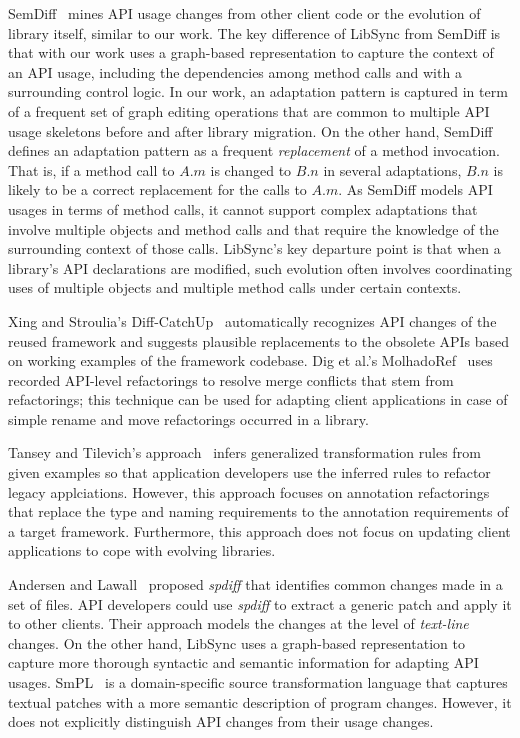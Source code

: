 \documentclass[runningheads,a4paper]{llncs}
\begin{document}
SemDiff~\cite{Dagenais2008} mines API usage changes from other client code or the evolution of library itself, similar to our work.  The key difference of {LibSync} from SemDiff is that with our work uses a graph-based representation to capture the context of an API usage, including the dependencies among method calls and with a surrounding control logic. In our work, an adaptation pattern is captured in term of a frequent set of graph editing operations that are common to multiple API usage skeletons before and after library migration. On the other hand, SemDiff defines an adaptation pattern as a frequent {\em replacement} of a method invocation. That is, if a method call to $A.m$ is changed to $B.n$ in several adaptations, $B.n$ is likely to be a correct replacement for the calls to $A.m$. As SemDiff models API usages in terms of method calls, it cannot support complex adaptations that involve multiple objects and method calls and that require the knowledge of the surrounding context of those calls. {LibSync}'s key departure point is that when a library's API declarations are modified, such evolution often involves coordinating uses of multiple objects and multiple method calls under certain contexts.

Xing and Stroulia's Diff-CatchUp~\cite{Xing2007:diffcatchup} automatically recognizes API changes of the reused framework and suggests plausible replacements to the obsolete APIs based on working examples of the framework codebase.  Dig et al.'s MolhadoRef~\cite{Dig2007} uses recorded API-level refactorings to resolve merge conflicts that stem from refactorings; this technique can be used for adapting client applications in case of simple rename and move refactorings occurred in a library.  

Tansey and Tilevich's approach~\cite{Tansey2008:annotation} infers generalized transformation rules from given examples so that application developers use the inferred rules to refactor legacy applciations. However, this approach focuses on annotation refactorings that replace the type and naming requirements to the annotation requirements of a target framework. Furthermore, this approach does not focus on updating client applications to cope with evolving libraries. 

Andersen and Lawall~\cite{Andersen2008:patch} proposed {\em spdiff} that identifies common changes made in a set of files.  API developers could use {\em spdiff} to extract a generic patch and apply it to other clients. Their approach models the changes at the level of {\em text-line} changes. On the other hand, {LibSync} uses a graph-based representation to capture more thorough syntactic and semantic information for adapting API usages.  SmPL~\cite{Padioleau2007,Lawall2009:apienforce} is a domain-specific source transformation language that captures textual patches with a more semantic description of program changes. However, it does not explicitly distinguish API changes from their usage changes. 
\end{document}
